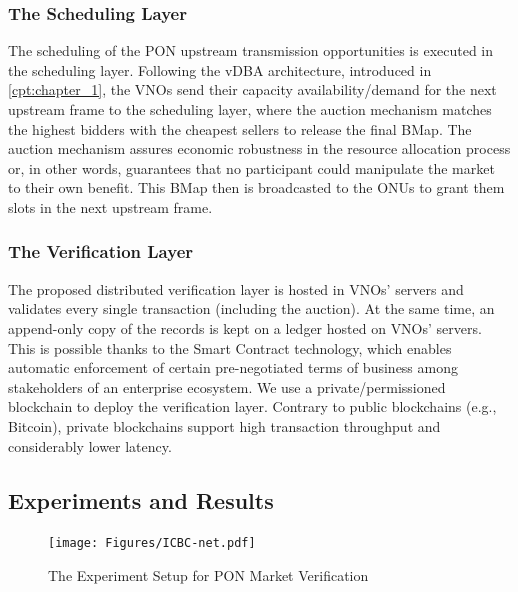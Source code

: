 \subsubsection{The Scheduling Layer}
The scheduling of the \ac{PON} upstream transmission opportunities is executed in the scheduling layer. Following the \ac{vDBA} architecture, introduced in \autoref{cpt:chapter_1}, the \acp{VNO} send their capacity availability/demand for the next upstream frame to the scheduling layer, where the auction mechanism \cite{8488596} matches the highest bidders with the cheapest sellers to release the final \ac{BMap}. The auction mechanism assures economic robustness in the resource allocation process or, in other words, guarantees that no participant could manipulate the market to their own benefit.
This \ac{BMap} then is broadcasted to the \acp{ONU} to grant them slots in the next upstream frame.
\subsubsection{The Verification Layer}
The proposed distributed verification layer is hosted in \acp{VNO}' servers and validates every single transaction (including the auction). At the same time, an append-only copy of the records is kept on a ledger hosted on \acp{VNO}' servers. This is possible thanks to the Smart Contract technology, which enables automatic enforcement of certain pre-negotiated terms of business among stakeholders of an enterprise ecosystem.
We use a private/permissioned blockchain to deploy the verification layer. Contrary to public blockchains (e.g., Bitcoin), private blockchains support high transaction throughput and considerably lower latency. 

\subsection{Experiments and Results} \label{bc:pon:sec:results}

\begin{figure}%
  \centering
  \texttt{[image: Figures/ICBC-net.pdf]}
\caption{The Experiment Setup for \ac{PON} Market Verification}
\label{Fig_bc_pon_VMs}
\end{figure}


